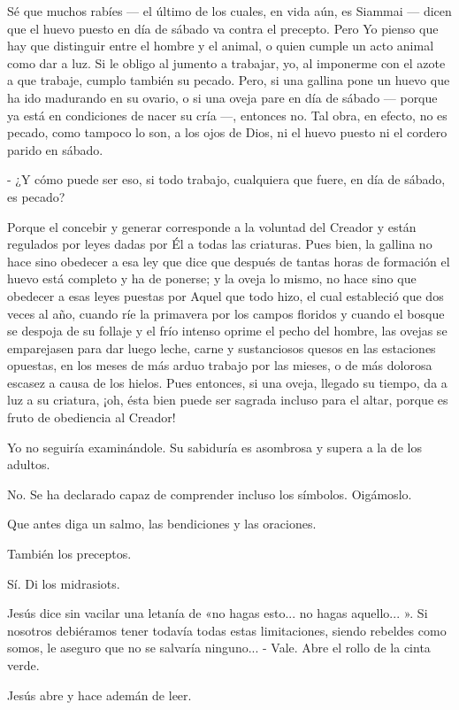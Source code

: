 \documentclass[12pt, twoside, openright]{book} %
\begin{document}
Sé que muchos rabíes — el último de los cuales, en vida aún, es Siammai — dicen que el huevo puesto en día de sábado va contra el precepto. Pero Yo pienso que hay que distinguir entre el hombre y el animal, o quien cumple un acto animal como dar a luz. Si le obligo al jumento a trabajar, yo, al imponerme con el azote a que trabaje, cumplo también su pecado. Pero, si una gallina pone un huevo que ha ido madurando en su ovario, o si una oveja pare en día de sábado — porque ya está en condiciones de nacer su cría —, entonces no. Tal obra, en efecto, no es pecado, como tampoco lo son, a los ojos de Dios, ni el huevo puesto ni el cordero parido en sábado. 

- ¿Y cómo puede ser eso, si todo trabajo, cualquiera que fuere, en día de sábado, es pecado? 

Porque el concebir y generar corresponde a la voluntad del Creador y están regulados por leyes dadas por Él a todas las criaturas. Pues bien, la gallina no hace sino obedecer a esa ley que dice que después de tantas horas de formación el huevo está completo y ha de ponerse; y la oveja lo mismo, no hace sino que obedecer a esas leyes puestas por Aquel que todo hizo, el cual estableció que dos veces al año, cuando ríe la primavera por los campos floridos y cuando el bosque se despoja de su follaje y el frío intenso oprime el pecho del hombre, las ovejas se emparejasen para dar luego leche, carne y sustanciosos quesos en las estaciones opuestas, en los meses de más arduo trabajo por las mieses, o de más dolorosa escasez a causa de los hielos. Pues entonces, si una oveja, llegado su tiempo, da a luz a su criatura, ¡oh, ésta bien puede ser sagrada incluso para el altar, porque es fruto de obediencia al Creador! 

Yo no seguiría examinándole. Su sabiduría es asombrosa y supera a la de los adultos. 

No. Se ha declarado capaz de comprender incluso los símbolos. Oigámoslo. 

Que antes diga un salmo, las bendiciones y las oraciones. 

También los preceptos. 

Sí. Di los midrasiots. 

Jesús dice sin vacilar una letanía de «no hagas esto... no hagas aquello... ». Si nosotros debiéramos tener todavía todas estas limitaciones, siendo rebeldes como somos, le aseguro que no se salvaría ninguno... - Vale. Abre el rollo de la cinta verde. 

Jesús abre y hace ademán de leer. 
\end{document}
